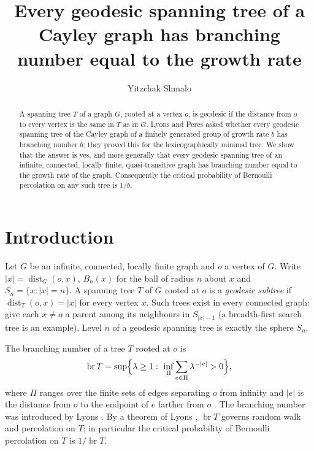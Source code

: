 \documentclass[11pt]{amsart}
\makeatletter
\newcommand{\AUTHORNAME}{Yitzchak Shmalo}
\newcommand{\AFFILIATION}{Einstein Institute of Mathematics, The Hebrew University of Jerusalem, Jerusalem, Israel}
\newcommand{\AUTHOREMAIL}{yitzchak.shmalo@gmail.com}
\theoremstyle{remark}
\DeclareMathOperator{\br}{br}
\DeclareMathOperator{\dist}{dist}
\makeatother
\begin{document}
\title[Branching number of geodesic spanning trees]{Every geodesic spanning tree of a Cayley graph has branching number equal to the growth rate}

\author{\AUTHORNAME}
\address{\AFFILIATION}
\email{\AUTHOREMAIL}


\begin{abstract}
A spanning tree $T$ of a graph $G$, rooted at a vertex $o$, is geodesic if the distance from $o$ to every vertex is the same in $T$ as in $G$. Lyons and Peres asked whether every geodesic spanning tree of the Cayley graph of a finitely generated group of growth rate $b$ has branching number $b$; they proved this for the lexicographically minimal tree. We show that the answer is yes, and more generally that every geodesic spanning tree of an infinite, connected, locally finite, quasi-transitive graph has branching number equal to the growth rate of the graph. Consequently the critical probability of Bernoulli percolation on any such tree is $1/b$.
\end{abstract}

\maketitle

\section{Introduction}

Let $G$ be an infinite, connected, locally finite graph and $o$ a vertex of $G$. Write $|x|=\dist_G(o,x)$, $B_n(x)$ for the ball of radius $n$ about $x$ and $S_n=\{x:|x|=n\}$. A spanning tree $T$ of $G$ rooted at $o$ is a \emph{geodesic subtree} if $\dist_T(o,x)=|x|$ for every vertex $x$. Such trees exist in every connected graph: give each $x\ne o$ a parent among its neighbours in $S_{|x|-1}$ (a breadth-first search tree is an example). Level $n$ of a geodesic spanning tree is exactly the sphere $S_n$.

The branching number of a tree $T$ rooted at $o$ is
\[
\br T=\sup\Bigl\{\lambda\ge1:\ \inf_{\Pi}\sum_{e\in\Pi}\lambda^{-|e|}>0\Bigr\},
\]
where $\Pi$ ranges over the finite sets of edges separating $o$ from infinity and $|e|$ is the distance from $o$ to the endpoint of $e$ farther from $o$ \cite[Section~1.2]{LP}. The branching number was introduced by Lyons \cite{Lyons1990}. By a theorem of Lyons \cite{Lyons1990}, $\br T$ governs random walk and percolation on $T$; in particular the critical probability of Bernoulli percolation on $T$ is $1/\br T$.
\end{document}
